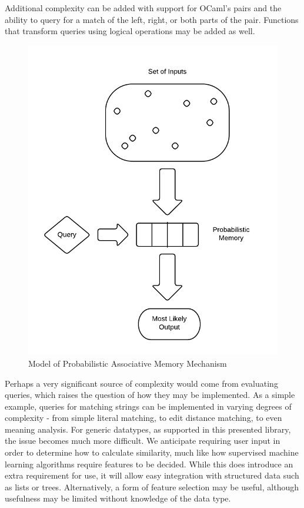 \documentclass{sig-alternate}
\begin{document}
Additional complexity can be added with support for OCaml's pairs and the 
ability to query for a match of the left, right, or both parts of the pair. Functions that transform
queries using logical operations may be added as well. 

\begin{figure}[H]
	\begin{center}
		\includegraphics[width=1\linewidth]{pammodel}
	\end{center}
	\vspace{-12pt}
	\caption{Model of Probabilistic Associative Memory Mechanism}
	\label{fig:pammodel}
\end{figure}

Perhaps a very significant source of complexity would come from evaluating
queries, which raises the question
of how they may be implemented. 
As a simple example, queries for matching strings can be implemented in varying 
degrees of complexity - from simple literal matching, to edit distance matching, 
to even meaning analysis. For generic datatypes, as supported in this presented
library, the issue becomes much more difficult. We anticipate requiring user
input in order to determine how to calculate similarity, much like how 
supervised machine learning algorithms require features to be decided. 
While this does
introduce an extra requirement for use, it will allow easy integration with
structured data such as lists or trees. Alternatively, a form of feature
selection may be useful, although usefulness may be limited without knowledge
of the data type. 
\end{document}
